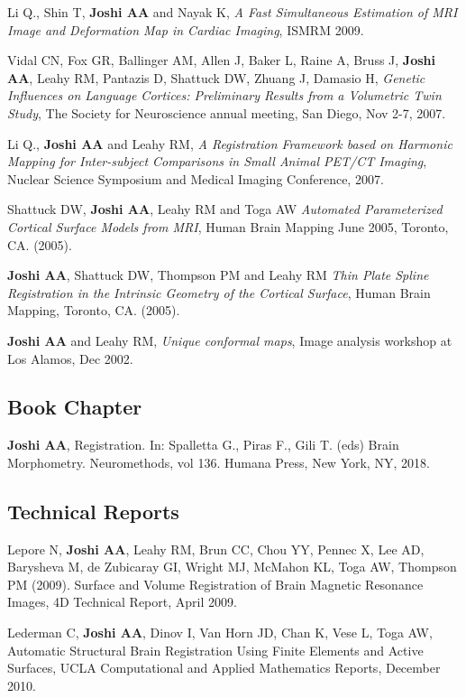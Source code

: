 \documentclass[overlapped,line,letterpaper]{res}
\begin{document}
\begin{resume}
Li Q., Shin T, \textbf{Joshi AA} and Nayak K, \textit{A Fast Simultaneous Estimation of MRI Image and Deformation Map in Cardiac Imaging}, ISMRM 2009. 

Vidal CN, Fox GR, Ballinger AM, Allen J, Baker L, Raine A, Bruss J, \textbf{Joshi AA}, Leahy RM, Pantazis D, Shattuck DW, Zhuang J, Damasio H, \textit{Genetic Influences on Language Cortices: Preliminary Results from a Volumetric Twin Study}, The Society for Neuroscience annual meeting, San Diego, Nov 2-7, 2007.

Li Q., \textbf{Joshi AA} and Leahy RM, \textit{A Registration Framework based on Harmonic Mapping for Inter-subject Comparisons in Small Animal {PET/CT} Imaging}, Nuclear Science Symposium and Medical Imaging Conference, 2007.

Shattuck DW, \textbf{Joshi AA}, Leahy RM and Toga AW \textit{Automated Parameterized Cortical Surface Models from MRI}, Human Brain Mapping June 2005, Toronto, CA. (2005).

\textbf{Joshi AA}, Shattuck DW, Thompson PM and Leahy RM \textit{Thin Plate Spline Registration in the Intrinsic Geometry of the Cortical Surface},  Human Brain Mapping, Toronto, CA. (2005).

\textbf{Joshi AA} and Leahy RM, \textit{Unique conformal maps},  Image analysis workshop at Los Alamos, Dec 2002. 

\subsection{Book Chapter}

\textbf{Joshi AA},  Registration. In: Spalletta G., Piras F., Gili T. (eds) Brain Morphometry. Neuromethods, vol 136. Humana Press, New York, NY, 2018.

\subsection{Technical Reports}

Lepore N, \textbf{Joshi AA}, Leahy RM, Brun CC, Chou YY, Pennec X, Lee AD, Barysheva M, de Zubicaray GI, Wright MJ, McMahon KL, Toga AW, Thompson PM (2009). Surface and Volume Registration of Brain Magnetic Resonance Images, 4D Technical Report, April 2009.

Lederman C, \textbf{Joshi AA}, Dinov I, Van Horn JD, Chan K, Vese L, Toga AW, Automatic Structural Brain Registration Using Finite Elements and Active Surfaces, UCLA Computational and Applied Mathematics Reports, December 2010. 


\end{resume}
\end{document}
